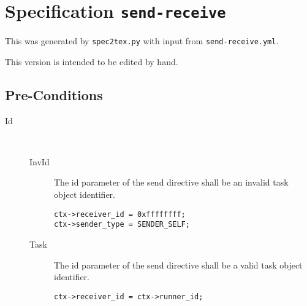 \section{Specification \texttt{send-receive}}

This was generated by \texttt{spec2tex.py}
with input from \texttt{send-receive.yml}.

This version is intended to be edited by hand.


\subsection{Pre-Conditions}

\begin{description}
  \item[Id]~
  \begin{description}
  \item[InvId]
    The id parameter of the send directive shall be an invalid task object
identifier.
\begin{verbatim}
ctx->receiver_id = 0xffffffff;
ctx->sender_type = SENDER_SELF;
\end{verbatim}
  \item[Task]
    The id parameter of the send directive shall be a valid task object
identifier.
\begin{verbatim}
ctx->receiver_id = ctx->runner_id;
\end{verbatim}
  \end{description}


\end{description}
